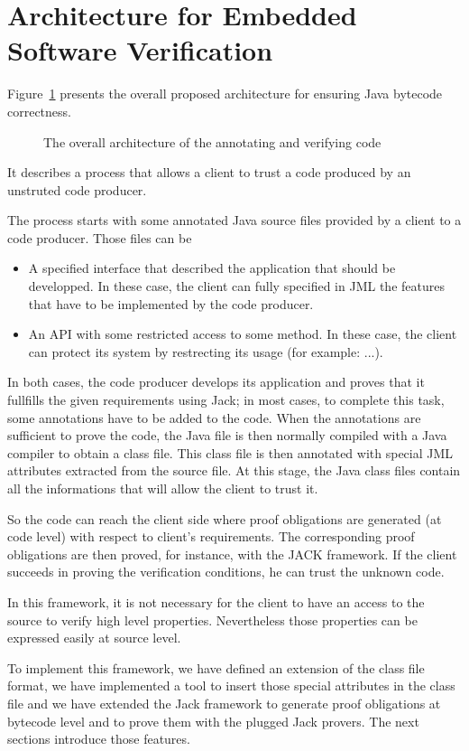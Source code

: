 \section{Architecture for Embedded Software Verification}
\label{architecture_s}	
Figure~\ref{architecture} presents the overall proposed architecture for ensuring Java bytecode correctness. 
\begin{figure}[ht!]
\begin{center}
\caption{The overall architecture of the annotating and verifying code}
\label{architecture}
\end{center}
\end{figure}
It describes a process that allows a client to trust a code produced by an unstruted code producer.

The process starts with some annotated Java source files provided by a client to a code producer. Those files can be
\begin{itemize}
\item A specified interface that described the application that should be developped. In these case, the client can fully specified in JML the features that have to be implemented by the code producer.
\item An API with some restricted access to some method. In these case, the client can protect its system by restrecting its usage (for example: ...). 
\end{itemize}
In both cases, the code producer develops its application and proves that it fullfills the given requirements using Jack; 
in most cases, to complete this task, some annotations have to be added to the code.
When the annotations are sufficient to prove the code, the Java file is then normally compiled with a Java compiler to obtain a 
class file. 
This class file is then annotated with special JML attributes extracted from the source file. 
At this stage, the Java class files contain all the informations that will allow the client to trust it.

So the code can reach the client side where proof obligations are generated (at code level) with respect to client's requirements. 
The corresponding proof obligations are then proved, for instance, with the JACK framework. If the client succeeds in proving 
the verification conditions, he can trust the unknown code. 

In this framework, it is not necessary for the client to have an access to the source to verify high level properties. 
Nevertheless those properties can be expressed easily at source level.

To implement this framework, we have defined an extension of the class file format, we have implemented a tool to insert 
those special attributes in the class file and we have extended the Jack framework to generate proof obligations at bytecode level and to prove them with the plugged Jack provers. The next sections introduce those features.  


